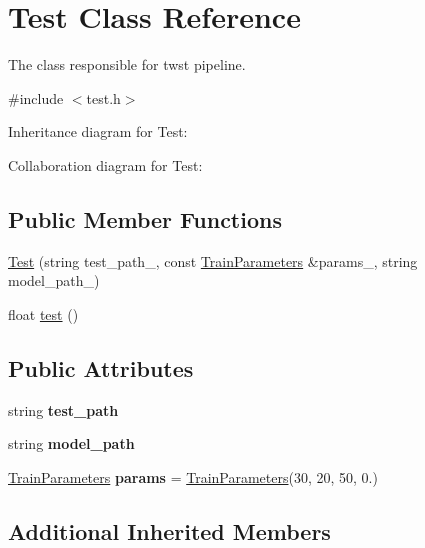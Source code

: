 \hypertarget{classTest}{}\section{Test Class Reference}
\label{classTest}


The class responsible for twst pipeline.  




{\ttfamily \#include $<$test.\+h$>$}



Inheritance diagram for Test\+:


Collaboration diagram for Test\+:
\subsection*{Public Member Functions}
\begin{DoxyCompactItemize}
\item 
\hyperlink{classTest_a6eeaef1054e710158c2d48a6c3497a23}{Test} (string test\+\_\+path\+\_\+, const \hyperlink{structTrainParameters}{Train\+Parameters} \&params\+\_\+, string model\+\_\+path\+\_\+)
\item 
float \hyperlink{classTest_ae984138ce2da7b201d3fa97a4b775fb3}{test} ()
\end{DoxyCompactItemize}
\subsection*{Public Attributes}
\begin{DoxyCompactItemize}
\item 
\mbox{\label{classTest_a21a60879556addaa11427cb30b9be5fc}} 
string {\bfseries test\+\_\+path}
\item 
\mbox{\label{classTest_a857cf5151c5bd7e29d33569bd7237fde}} 
string {\bfseries model\+\_\+path}
\item 
\mbox{\label{classTest_a25806965ae8a4513ccad5ad31ce8a8df}} 
\hyperlink{structTrainParameters}{Train\+Parameters} {\bfseries params} = \hyperlink{structTrainParameters}{Train\+Parameters}(30, 20, 50, 0.)
\end{DoxyCompactItemize}
\subsection*{Additional Inherited Members}


